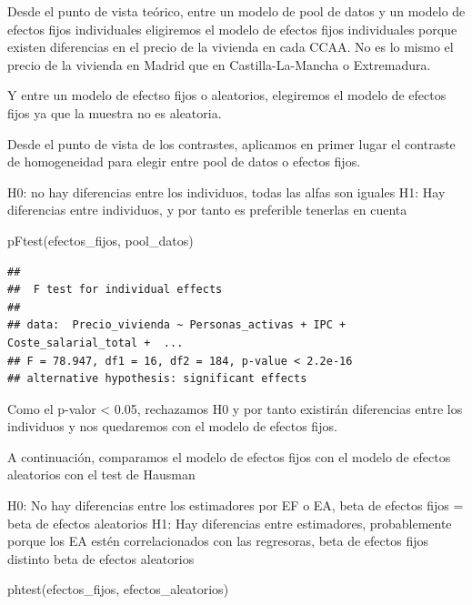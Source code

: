 \documentclass[
]{article}
\newenvironment{Shaded}{\begin{snugshade}}{\end{snugshade}}
\newcommand{\FunctionTok}[1]{\textcolor[rgb]{0.00,0.00,0.00}{#1}}
\newcommand{\NormalTok}[1]{#1}
\begin{document}
Desde el punto de vista teórico, entre un modelo de pool de datos y un
modelo de efectos fijos individuales eligiremos el modelo de efectos
fijos individuales porque existen diferencias en el precio de la
vivienda en cada CCAA. No es lo mismo el precio de la vivienda en Madrid
que en Castilla-La-Mancha o Extremadura.

Y entre un modelo de efectso fijos o aleatorios, elegiremos el modelo de
efectos fijos ya que la muestra no es aleatoria.

Desde el punto de vista de los contrastes, aplicamos en primer lugar el
contraste de homogeneidad para elegir entre pool de datos o efectos
fijos.

H0: no hay diferencias entre los individuos, todas las alfas son iguales
H1: Hay diferencias entre individuos, y por tanto es preferible tenerlas
en cuenta

\begin{Shaded}
\begin{Highlighting}[]
\FunctionTok{pFtest}\NormalTok{(efectos\_fijos, pool\_datos)}
\end{Highlighting}
\end{Shaded}

\begin{verbatim}
## 
##  F test for individual effects
## 
## data:  Precio_vivienda ~ Personas_activas + IPC + Coste_salarial_total +  ...
## F = 78.947, df1 = 16, df2 = 184, p-value < 2.2e-16
## alternative hypothesis: significant effects
\end{verbatim}

Como el p-valor \textless{} 0.05, rechazamos H0 y por tanto existirán
diferencias entre los individuos y nos quedaremos con el modelo de
efectos fijos.

A continuación, comparamos el modelo de efectos fijos con el modelo de
efectos aleatorios con el test de Hausman

H0: No hay diferencias entre los estimadores por EF o EA, beta de
efectos fijos = beta de efectos aleatorios H1: Hay diferencias entre
estimadores, probablemente porque los EA estén correlacionados con las
regresoras, beta de efectos fijos distinto beta de efectos aleatorios

\begin{Shaded}
\begin{Highlighting}[]
\FunctionTok{phtest}\NormalTok{(efectos\_fijos, efectos\_aleatorios)}
\end{Highlighting}
\end{Shaded}
\end{document}

